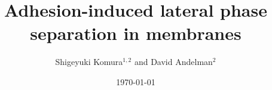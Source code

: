 
\def\btt#1{{\tt$\backslash$#1}}
\def\BibTeX{\rm B{\sc ib}\TeX}

\draft
{}






\title{Adhesion-induced lateral phase separation in membranes}


\author{
Shigeyuki Komura$^{1,2}$\cite{komura}
and David Andelman$^2$
}

\address{
$^1$Department of Materials and Interfaces,
Weizmann Institute of Science,
Rehovot 76100, Israel
}

\address{
$^2$School of Physics and Astronomy,
Raymond and Beverly Sackler Faculty of Exact Sciences, \\
Tel Aviv University, Ramat Aviv 69978, Tel Aviv, Israel
}


\date{\today}
\maketitle






